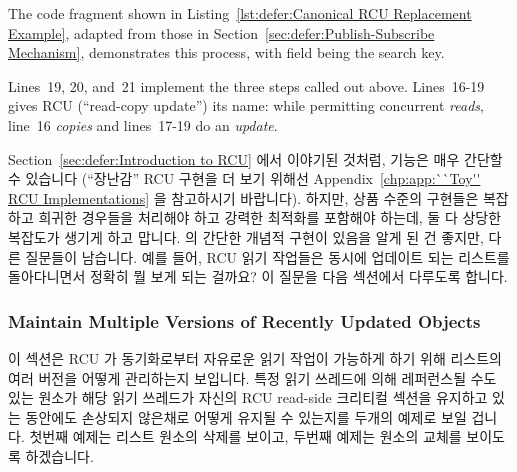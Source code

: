 The code fragment shown in
Listing~\ref{lst:defer:Canonical RCU Replacement Example},
adapted from those in Section~\ref{sec:defer:Publish-Subscribe Mechanism},
demonstrates this process, with field  being the search key.

Lines~19, 20, and~21 implement the three steps called out above.
Lines~16-19 gives RCU (``read-copy update'') its name: while permitting
concurrent \emph{reads}, line~16 \emph{copies} and lines~17-19
do an \emph{update}.
\fi

Section~\ref{sec:defer:Introduction to RCU} 에서 이야기된 것처럼,
 기능은 매우 간단할 수 있습니다 (``장난감'' RCU 구현을 더
보기 위해선
Appendix~\ref{chp:app:``Toy'' RCU Implementations} 을 참고하시기
바랍니다).
하지만, 상품 수준의 구현들은 복잡하고 희귀한 경우들을 처리해야 하고 강력한
최적화를 포함해야 하는데, 둘 다 상당한 복잡도가 생기게 하고 맙니다.
 의 간단한 개념적 구현이 있음을 알게 된 건 좋지만, 다른
질문들이 남습니다.
예를 들어, RCU 읽기 작업들은 동시에 업데이트 되는 리스트를 돌아다니면서 정확히
뭘 보게 되는 걸까요?
이 질문을 다음 섹션에서 다루도록 합니다.

\subsubsection{Maintain Multiple Versions of Recently Updated Objects}
\label{sec:defer:Maintain Multiple Versions of Recently Updated Objects}

이 섹션은 RCU 가 동기화로부터 자유로운 읽기 작업이 가능하게 하기 위해 리스트의
여러 버전을 어떻게 관리하는지 보입니다.
특정 읽기 쓰레드에 의해 레퍼런스될 수도 있는 원소가 해당 읽기 쓰레드가 자신의
RCU read-side 크리티컬 섹션을 유지하고 있는 동안에도 손상되지 않은채로 어떻게
유지될 수 있는지를 두개의 예제로 보일 겁니다.
첫번째 예제는 리스트 원소의 삭제를 보이고, 두번째 예제는 원소의 교체를 보이도록
하겠습니다.
\iffalse

